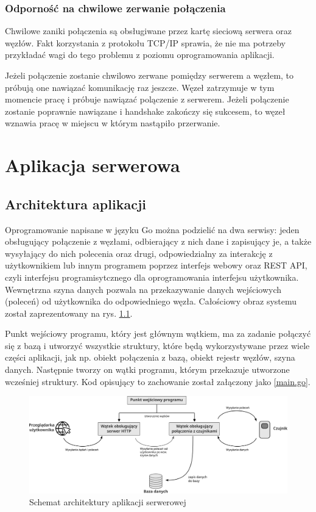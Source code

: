 \documentclass[12pt,oneside,a4paper]{book}
\theoremstyle{break}
\begin{document}
\subsection{Odporność na chwilowe zerwanie połączenia}
Chwilowe zaniki połączenia są obsługiwane przez kartę sieciową serwera
oraz węzłów. Fakt korzystania z protokołu TCP/IP sprawia, że nie
ma potrzeby przykładać wagi do tego problemu z poziomu oprogramowania
aplikacji. 
\par Jeżeli połączenie zostanie
chwilowo zerwane pomiędzy serwerem a węzłem, to próbują one 
nawiązać komunikację raz jeszcze. Węzeł zatrzymuje w tym momencie pracę
i próbuje nawiązać polączenie z serwerem. Jeżeli połączenie
zostanie poprawnie nawiązane i handshake zakończy się sukcesem, to
węzeł wznawia pracę w miejscu w którym nastąpiło przerwanie.


\chapter{Aplikacja serwerowa}
\section{Architektura aplikacji}
Oprogramowanie napisane w języku Go można podzielić na dwa serwisy:
jeden obsługujący połączenie z węzłami, odbierający z nich dane i
zapisujący je, a także wysyłający do nich polecenia oraz drugi, 
odpowiedzialny za interakcję z użytkownikiem lub innym programem 
poprzez interfejs webowy oraz REST API, czyli interfejsu
programisytcznego dla oprogramowania interfejsu użytkownika.
Wewnętrzna szyna danych pozwala na
przekazywanie danych wejściowych (poleceń) od użytkownika do odpowiedniego
węzła. Całościowy obraz systemu został zaprezentowany na rys. \ref{rys:server-app-schema}.
\par Punkt wejściowy programu, który 
jest głównym wątkiem, ma za zadanie
połączyć się z bazą i utworzyć wszystkie 
struktury, które będą wykorzystywane
przez wiele części aplikacji, jak np. obiekt połączenia z bazą, obiekt
rejestr węzłów, szyna danych. 
Następnie tworzy on wątki programu, 
którym przekazuje utworzone wcześniej struktury.
Kod opisujący to zachowanie został załączony
jako \ref*{main.go}.

\begin{figure}[H]
    \begin{center}
        \includegraphics[width=\textwidth]{schemat_architektury_aplikacji_serwerowej.png}        
        \caption{Schemat architektury aplikacji serwerowej}        
        \label{rys:server-app-schema}
    \end{center}
\end{figure}
\end{document}
